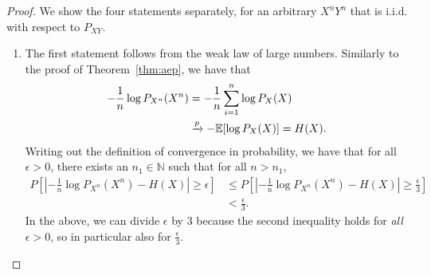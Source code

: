 \begin{proof}
We show the four statements separately, for an arbitrary $X^nY^n$ that is i.i.d. with respect to $P_{XY}$.
\begin{enumerate}
\item The first statement follows from the weak law of large numbers. Similarly to the proof of Theorem~\ref{thm:aep}, we have that
\begin{align}
-\frac{1}{n} \log P_{X^n}(X^n) &= - \frac{1}{n} \sum_{i=1}^n \log P_X(X)\nonumber\\
&\xrightarrow{p} - \mathbb{E}[\log P_X(X)] = H(X).
\end{align}
Writing out the definition of convergence in probability, we have that for all $\epsilon > 0$, there exists an $n_1 \in \mathbb{N}$ such that for all $n > n_1$,
\begin{align}\label{eq:joint-aep-1}
P\left[\left|-\frac{1}{n} \log P_{X^n}(X^n) - H(X)\right| \geq \epsilon \right] &\leq P\left[\left|-\frac{1}{n} \log P_{X^n}(X^n) - H(X)\right| \geq \frac{\epsilon}{3} \right]\nonumber\\
&< \frac{\epsilon}{3}.
\end{align}
In the above, we can divide $\epsilon$ by 3 because the second inequality holds for \emph{all} $\epsilon > 0$, so in particular also for $\frac{\epsilon}{3}$.


\end{enumerate}
\end{proof}
